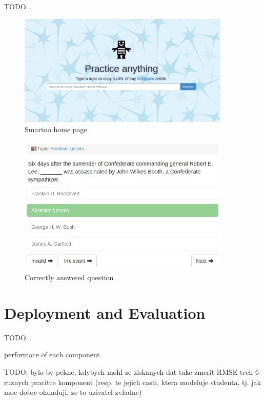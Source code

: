 \documentclass[a4paper, 12pt, twoside]{fithesis2}		%
\renewcommand{\_}{\leavevmode \kern0.0em\vbox{\hrule width0.4em}}
\begin{document}
TODO...

\begin{figure}[h]
  \centering
  \includegraphics[width=0.9\textwidth]{images/home-page.png}
  \caption{Smartoo home page}
  \label{fig:smartoo-home}
\end{figure}

\begin{figure}[h]
  \centering
  \includegraphics[width=0.9\textwidth]{images/answered-correctly.png}
  \caption{Correctly answered question}
  \label{fig:correctly-answered-question}
\end{figure}


\chapter{Deployment and Evaluation}
\label{chap:evaluation}

TODO...

performace of each component

TODO: bylo by pekne, kdybych mohl ze ziskanych dat take zmerit RMSE tech 6 ruznych pracitce komponent (resp. te jejich casti, ktera modeluje studenta, tj. jak moc dobre ohdaduji, ze to uzivatel zvladne)
\end{document}
